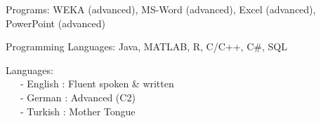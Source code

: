 \documentclass[margin]{res}
\begin{document}
\begin{resume}
\begin{list}{}{\leftmargin=0.5em}
\item Programs:  WEKA (advanced), MS-Word (advanced), Excel (advanced), PowerPoint (advanced) 
\item Programming  Languages: Java, MATLAB, R, C/C++, C\#, SQL
\item Languages: \\
	~~~- English	: Fluent spoken \& written \\
	~~~- German	: Advanced (C2) \\
	~~~- Turkish	: Mother Tongue \\
\end{list}




\end{resume} 
\end{document}
